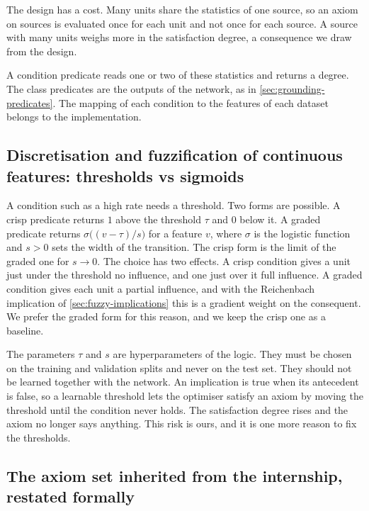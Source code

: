 The design has a cost. Many units share the statistics of one source, so an
axiom on sources is evaluated once for each unit and not once for each source.
A source with many units weighs more in the satisfaction degree, a
consequence we draw from the design.

A condition predicate reads one or two of these statistics and returns a
degree. The class predicates are the outputs of the network, as in
\cref{sec:grounding-predicates}. The mapping of each condition to the
features of each dataset belongs to the implementation.

\subsection{Discretisation and fuzzification of continuous features: thresholds vs sigmoids}
\label{sec:fuzzification}

A condition such as a high rate needs a threshold. Two forms are possible. A
crisp predicate returns $1$ above the threshold $\tau$ and $0$ below it. A
graded predicate returns $\sigma\bigl((v-\tau)/s\bigr)$ for a feature $v$,
where $\sigma$ is the logistic function and $s>0$ sets the width of the
transition. The crisp form is the limit of the graded one for $s\to 0$. The
choice has two effects. A crisp condition gives a unit just under the
threshold no influence, and one just over it full influence. A graded
condition gives each unit a partial influence, and with the Reichenbach
implication of \cref{sec:fuzzy-implications} this is a gradient weight on the
consequent. We prefer the graded form for this reason, and we keep the crisp
one as a baseline.

The parameters $\tau$ and $s$ are hyperparameters of the logic. They must be
chosen on the training and validation splits and never on the test set. They
should not be learned together with the network. An implication is true when
its antecedent is false, so a learnable threshold lets the optimiser satisfy
an axiom by moving the threshold until the condition never holds. The
satisfaction degree rises and the axiom no longer says anything. This risk is
ours, and it is one more reason to fix the thresholds.

\subsection{The axiom set inherited from the internship, restated formally}
\label{sec:axiom-set-internship}


